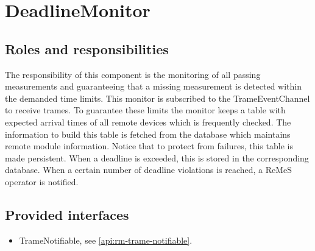 \section{DeadlineMonitor}
\label{element:rm-deadline-monitor}

\subsection{Roles and responsibilities}

\npar The responsibility of this component is the monitoring of all passing
measurements and guaranteeing that a missing measurement is detected within the
demanded time limits. This monitor is subscribed to the TrameEventChannel to
receive trames. To guarantee these limits the monitor keeps a table with
expected arrival times of all remote devices which is frequently checked. The
information to build this table is fetched from the database which maintains
remote module information. Notice that to protect from failures, this table is
made persistent. When a deadline is exceeded, this is stored in the
corresponding database. When a certain number of deadline violations is reached,
a ReMeS operator is notified.

\subsection{Provided interfaces}

\begin{itemize}
  \item TrameNotifiable, see \ref{api:rm-trame-notifiable}.
\end{itemize}